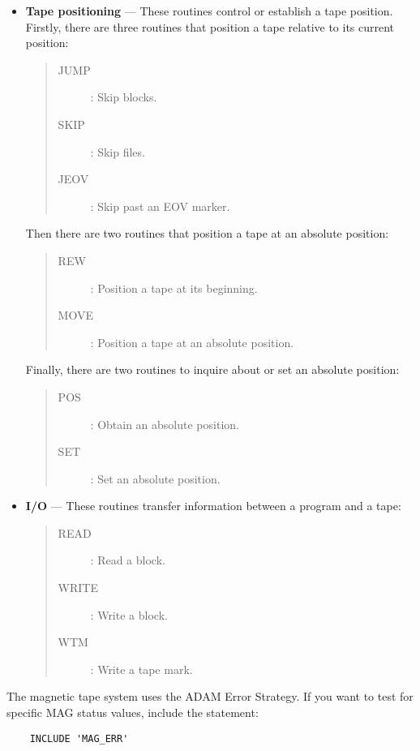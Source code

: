 \begin{itemize}
\item {\bf Tape positioning} --- These routines control or establish a tape
 position.
 Firstly, there are three routines that position a tape relative to its
 current position:
\begin{quote}
\begin{description}
\item [JUMP] : Skip blocks.
\item [SKIP] : Skip files.
\item [JEOV] : Skip past an EOV marker.
\end{description}
\end{quote}
 Then there are two routines that position a tape at an absolute position:
\begin{quote}
\begin{description}
\item [REW] : Position a tape at its beginning.
\item [MOVE] : Position a tape at an absolute position.
\end{description}
\end{quote}
 Finally, there are two routines to inquire about or set an absolute position:
\begin{quote}
\begin{description}
\item [POS] : Obtain an absolute position.
\item [SET] : Set an absolute position.
\end{description}
\end{quote}

\item {\bf I/O} --- These routines transfer information between a program
 and a tape:
\begin{quote}
\begin{description}
\item [READ] : Read a block.
\item [WRITE] : Write a block.
\item [WTM] : Write a tape mark.
\end{description}
\end{quote}
\end{itemize}

The magnetic tape system uses the ADAM Error Strategy.
If you want to test for specific MAG status values, include the statement:

\begin{small}
\begin{verbatim}
    INCLUDE 'MAG_ERR'
\end{verbatim}
\end{small}

